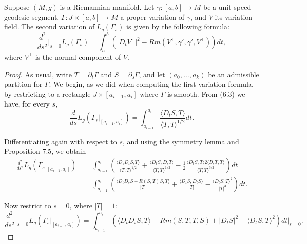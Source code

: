 \begin{theorem}
\label{thm:second-variation-formula}
Suppose $(M,g)$ is a Riemannian manifold. Let $\gamma: [a,b] \to M$ be a unit-speed geodesic segment, $\Gamma: J \times [a,b] \to M$ a proper variation of $\gamma$, and $V$ its variation field. The second variation of $L_g(\Gamma_s)$ is given by the following formula:
\begin{equation}
\frac{d^2}{ds^2}\bigg|_{s=0} L_g(\Gamma_s) = \int_a^b \left( \lvert D_t V^\perp \rvert^2 - Rm(V^\perp, \gamma', \gamma', V^\perp) \right) dt,
\tag{10.19}
\end{equation}
where $V^\perp$ is the normal component of $V$.

\begin{proof}
As usual, write $T = \partial_t\Gamma$ and $S = \partial_s\Gamma$, and let $(a_0, \ldots, a_k)$ be an admissible partition for $\Gamma$. We begin, as we did when computing the first variation formula, by restricting to a rectangle $J \times [a_{i-1}, a_i]$ where $\Gamma$ is smooth. From (6.3) we have, for every $s$,
\[
\frac{d}{ds} L_g(\Gamma_s|_{[a_{i-1},a_i]}) = \int_{a_{i-1}}^{a_i} \frac{\langle D_t S, T \rangle}{\langle T, T \rangle^{1/2}} dt.
\]

Differentiating again with respect to $s$, and using the symmetry lemma and Proposition 7.5, we obtain
\begin{align*}
\frac{d^2}{ds^2} L_g(\Gamma_s|_{[a_{i-1},a_i]})
&= \int_{a_{i-1}}^{a_i} \left( \frac{\langle D_s D_t S, T \rangle}{\langle T, T \rangle^{1/2}} + \frac{\langle D_t S, D_s T \rangle}{\langle T, T \rangle^{1/2}} - \frac{1}{2} \frac{\langle D_t S, T \rangle 2\langle D_s T, T \rangle}{\langle T, T \rangle^{3/2}} \right) dt \\
&= \int_{a_{i-1}}^{a_i} \left( \frac{\langle D_t D_s S + R(S,T)S, T \rangle}{\lvert T \rvert} + \frac{\langle D_t S, D_t S \rangle}{\lvert T \rvert} - \frac{\langle D_t S, T \rangle^2}{\lvert T \rvert^3} \right) dt.
\end{align*}

Now restrict to $s = 0$, where $\lvert T \rvert = 1$:
\begin{equation}
\frac{d^2}{ds^2}\bigg|_{s=0} L_g(\Gamma_s|_{[a_{i-1},a_i]}) = \int_{a_{i-1}}^{a_i} \left( \langle D_t D_s S, T \rangle - Rm(S, T, T, S) + \lvert D_t S \rvert^2 - \langle D_t S, T \rangle^2 \right) dt\bigg|_{s=0}.
\tag{10.20}
\end{equation}


\end{proof}
\end{theorem}
